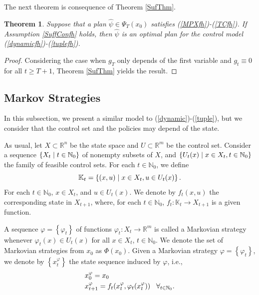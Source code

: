 \documentclass[3p]{elsarticle}
\newcommand{\rzn}{\mathbb R^{n}}
\newcommand{\rzm}{\mathbb R^{m}}
\newcommand{\nat}{\mathbb N_0}
\newtheorem{thm}{Theorem}
\begin{document}
	
	
	
	The next theorem is consequence of Theorem \ref{SufThm}.
	
	
	\begin{thm}\label{SufThmfh}
		Suppose that a plan $\hat{\psi}\in\Psi_T(x_0)$ satisfies (\ref{MPXfh})-(\ref{TCfh}). If Assumption \ref{SuffConfh} holds, then $\hat\psi$ is an optimal plan for the control model (\ref{dynamicfh})-(\ref{tuplefh}).
	\end{thm}
	
	\begin{proof}
		Considering the case when $g_T$ only depends of the first variable and $g_t\equiv0$ for all $t\ge T+1$, Theorem \ref{SufThm} yields the result.
	\end{proof}
	
	
	
	
	
	\subsection{Markov Strategies}\label{Markovmodel}
	
	
	
	
	
	In this subsection, we present a similar model to (\ref{dynamic})-(\ref{tuple}), but we consider that the control set and the policies may depend of the state.
	
	As usual, let $X\subset\rzn$ be the state space and $U\subset\rzm$ be the control set. Consider a sequence $\left\lbrace X_t\hspace{0.1cm}|\hspace{0.1cm} t\in\nat\right\rbrace$ of nonempty subsets of $X$, and  $\left\lbrace U_t(x)\hspace{0.1cm}|\hspace{0.1cm} x\in X_t,t\in\nat\right\rbrace $ the family of feasible control sets. For each $t\in\nat$, we define $$\mathbb K_t=\left\lbrace (x,u)\hspace{0.1cm}|\hspace{0.1cm} x\in X_t, u\in U_t(x) \right\rbrace. $$ For each $t\in\nat$, $x\in X_t$, and $u\in U_t(x)$. We denote by $f_t(x,u)$ the corresponding state in $X_{t+1}$,  where, for each $t\in\nat$, $f_t:\mathbb K_t\to X_{t+1}$ is a given function.
	
	A sequence $\varphi=\left\lbrace \varphi_t\right\rbrace $ of functions $\varphi_t:X_t\to \rzm$ is called a Markovian strategy whenever $\varphi_t(x)\in U_t(x)$ for all $x\in X_t$, $t\in\nat$. We denote the set of Markovian strategies from $x_0$ as $\varPhi(x_0)$.
	Given a Markovian strategy $\varphi=\left\lbrace \varphi_t \right\rbrace $, we denote by $\left\lbrace x_t^\varphi \right\rbrace $ the state sequence induced by $\varphi$, i.e., 
	\begin{align}\label{dynamicms}
	&x_0^\varphi=x_0\\
	&x_{t+1}^\varphi=f_t(x_t^\varphi,\varphi_t(x_t^\varphi))\hspace{0.3cm}\forall_{t\in\nat}.\label{dynamicms2}
	\end{align}
	
\end{document}
